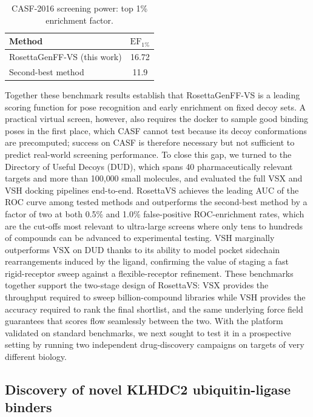 \documentclass[11pt]{article}
\begin{document}
\begin{table}[htbp]
\centering
\caption{CASF-2016 screening power: top 1\% enrichment factor.}
\label{tab:casf_screening}
\begin{tabular}{lc}
\toprule
Method & $\mathrm{EF}_{1\%}$ \\
\midrule
RosettaGenFF-VS (this work) & 16.72 \\
Second-best method & 11.9 \\
\bottomrule
\end{tabular}
\end{table}

Together these benchmark results establish that RosettaGenFF-VS is a
leading scoring function for pose recognition and early enrichment on
fixed decoy sets. A practical virtual screen, however, also requires the
docker to sample good binding poses in the first place, which CASF
cannot test because its decoy conformations are precomputed; success on
CASF is therefore necessary but not sufficient to predict real-world
screening performance. To close this gap, we turned to the Directory of
Useful Decoys (DUD), which spans 40 pharmaceutically relevant targets
and more than 100{,}000 small molecules, and evaluated the full VSX and
VSH docking pipelines end-to-end. RosettaVS achieves the leading
AUC of the ROC curve among tested methods and outperforms the second-best
method by a factor of two at both 0.5\% and 1.0\% false-positive
ROC-enrichment rates, which are the cut-offs most relevant to ultra-large
screens where only tens to hundreds of compounds can be advanced to
experimental testing. VSH marginally outperforms VSX on DUD thanks to
its ability to model pocket sidechain rearrangements induced by the
ligand, confirming the value of staging a fast rigid-receptor sweep
against a flexible-receptor refinement. These benchmarks together support
the two-stage design of RosettaVS: VSX provides the throughput required
to sweep billion-compound libraries while VSH provides the accuracy
required to rank the final shortlist, and the same underlying force
field guarantees that scores flow seamlessly between the two. With the
platform validated on standard benchmarks, we next sought to test it in
a prospective setting by running two independent drug-discovery
campaigns on targets of very different biology.

\subsection{Discovery of novel KLHDC2 ubiquitin-ligase binders}
\end{document}
